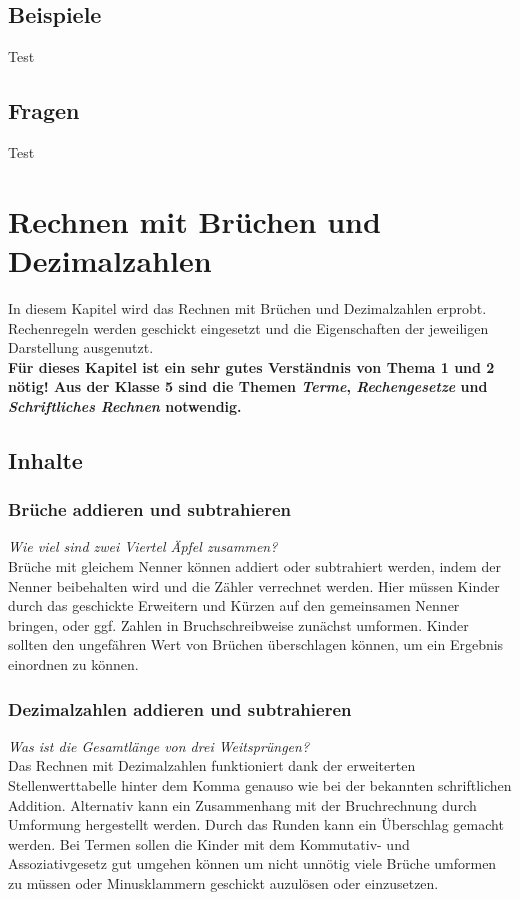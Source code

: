\documentclass{article}
\begin{document}
\subsection{Beispiele}
\begin{tcolorbox}[colback=gray!5!white,colframe=gray!25!black]
Test
\end{tcolorbox}
\subsection{Fragen}
\begin{tcolorbox}[colback=blue!5!white,colframe=blue!25!black]
Test
\end{tcolorbox}
\newpage
\section{Rechnen mit Brüchen und Dezimalzahlen}
In diesem Kapitel wird das Rechnen mit Brüchen und Dezimalzahlen erprobt. Rechenregeln werden geschickt eingesetzt und die Eigenschaften der jeweiligen Darstellung ausgenutzt.\\
\textbf{Für dieses Kapitel ist ein sehr gutes Verständnis von Thema 1 und 2 nötig! Aus der Klasse 5 sind die Themen \textit{Terme}, \textit{Rechengesetze} und \textit{Schriftliches Rechnen} notwendig.}
\subsection{Inhalte}
\subsubsection*{Brüche addieren und subtrahieren}
\textit{Wie viel sind zwei Viertel Äpfel zusammen?}\\
Brüche mit gleichem Nenner können addiert oder subtrahiert werden, indem der Nenner beibehalten wird und die Zähler verrechnet werden.
Hier müssen Kinder durch das geschickte Erweitern und Kürzen auf den gemeinsamen Nenner bringen, oder ggf. Zahlen in Bruchschreibweise zunächst umformen.
Kinder sollten den ungefähren Wert von Brüchen überschlagen können, um ein Ergebnis einordnen zu können.
\subsubsection*{Dezimalzahlen addieren und subtrahieren}
\textit{Was ist die Gesamtlänge von drei Weitsprüngen?}\\
Das Rechnen mit Dezimalzahlen funktioniert dank der erweiterten Stellenwerttabelle hinter dem Komma genauso wie bei der bekannten schriftlichen Addition.
Alternativ kann ein Zusammenhang mit der Bruchrechnung durch Umformung hergestellt werden.
Durch das Runden kann ein Überschlag gemacht werden.
Bei Termen sollen die Kinder mit dem Kommutativ- und Assoziativgesetz gut umgehen können um nicht unnötig viele Brüche umformen zu müssen oder Minusklammern geschickt auzulösen oder einzusetzen.
\end{document}

